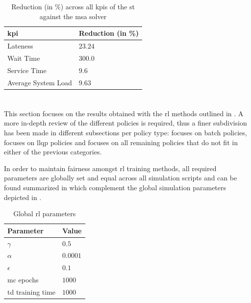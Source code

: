 \documentclass{seal_thesis}
\begin{document}
\begin{table}[!ht]
\centering
\begin{tabular}{@{}ll@{}}
\toprule
\gls{kpi}                 & Reduction (in \%) \\ \midrule
Lateness            & $23.24$             \\
Wait Time           & $300.0$             \\
Service Time        & $9.6$             \\
Average System Load & $9.63$             \\ \bottomrule
\end{tabular}
\caption{Reduction (in \%) across all \glspl{kpi} of the \gls{st} against the \gls{msa} solver}
\label{tab:opt_kpis_comp_gain}
\end{table}

\clearpage

\section{}
\label{sec:rl_results}

This section focuses on the results obtained with the \gls{rl} methods outlined in . A more in-depth review of the different policies is required, thus a finer subdivision has been made in different subsections per policy type:  focuses on batch policies,  focuses on \gls{llqp} policies and  focuses on all remaining policies that do not fit in either of the previous categories.

In order to maintain fairness amongst \gls{rl} training methods, all required parameters are globally set and equal across all simulation scripts and can be found summarized in  which complement the global simulation parameters depicted in .

\begin{table}[!ht]
\centering
\begin{tabular}{@{}ll@{}}
\toprule
Parameter        & Value  \\ \midrule
$\gamma$            & $0.5$    \\
$\alpha$            & $0.0001$ \\
$\epsilon$          & $0.1$    \\
\gls{mc} epochs        & $1000$   \\
\gls{td} training time & $1000$   \\ \bottomrule
\end{tabular}
\caption{Global \gls{rl} parameters}
\label{tab:global_rl_params}
\end{table}
\end{document}
